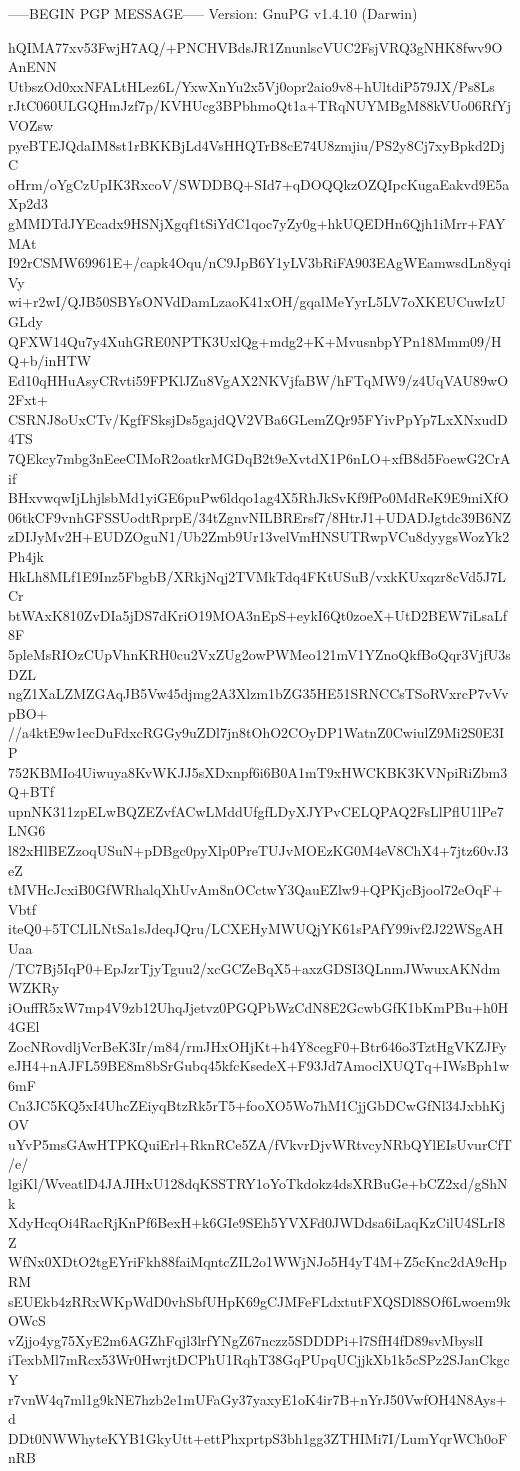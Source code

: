 -----BEGIN PGP MESSAGE-----
Version: GnuPG v1.4.10 (Darwin)

hQIMA77xv53FwjH7AQ/+PNCHVBdsJR1ZnunlscVUC2FsjVRQ3gNHK8fwv9OAnENN
UtbszOd0xxNFALtHLez6L/YxwXnYu2x5Vj0opr2aio9v8+hUltdiP579JX/Ps8Ls
rJtC060ULGQHmJzf7p/KVHUcg3BPbhmoQt1a+TRqNUYMBgM88kVUo06RfYjVOZsw
pyeBTEJQdaIM8st1rBKKBjLd4VsHHQTrB8cE74U8zmjiu/PS2y8Cj7xyBpkd2DjC
oHrm/oYgCzUpIK3RxcoV/SWDDBQ+SId7+qDOQQkzOZQIpcKugaEakvd9E5aXp2d3
gMMDTdJYEcadx9HSNjXgqf1tSiYdC1qoc7yZy0g+hkUQEDHn6Qjh1iMrr+FAYMAt
I92rCSMW69961E+/capk4Oqu/nC9JpB6Y1yLV3bRiFA903EAgWEamwsdLn8yqiVy
wi+r2wI/QJB50SBYsONVdDamLzaoK41xOH/gqalMeYyrL5LV7oXKEUCuwIzUGLdy
QFXW14Qu7y4XuhGRE0NPTK3UxlQg+mdg2+K+MvusnbpYPn18Mmm09/HQ+b/inHTW
Ed10qHHuAsyCRvti59FPKlJZu8VgAX2NKVjfaBW/hFTqMW9/z4UqVAU89wO2Fxt+
CSRNJ8oUxCTv/KgfFSksjDs5gajdQV2VBa6GLemZQr95FYivPpYp7LxXNxudD4TS
7QEkcy7mbg3nEeeCIMoR2oatkrMGDqB2t9eXvtdX1P6nLO+xfB8d5FoewG2CrAif
BHxvwqwIjLhjlsbMd1yiGE6puPw6ldqo1ag4X5RhJkSvKf9fPo0MdReK9E9miXfO
06tkCF9vnhGFSSUodtRprpE/34tZgnvNILBRErsf7/8HtrJ1+UDADJgtdc39B6NZ
zDIJyMv2H+EUDZOguN1/Ub2Zmb9Ur13velVmHNSUTRwpVCu8dyygsWozYk2Ph4jk
HkLh8MLf1E9Inz5FbgbB/XRkjNqj2TVMkTdq4FKtUSuB/vxkKUxqzr8cVd5J7LCr
btWAxK810ZvDIa5jDS7dKriO19MOA3nEpS+eykI6Qt0zoeX+UtD2BEW7iLsaLf8F
5pleMsRIOzCUpVhnKRH0cu2VxZUg2owPWMeo121mV1YZnoQkfBoQqr3VjfU3sDZL
ngZ1XaLZMZGAqJB5Vw45djmg2A3Xlzm1bZG35HE51SRNCCsTSoRVxrcP7vVvpBO+
//a4ktE9w1ecDuFdxcRGGy9uZDl7jn8tOhO2COyDP1WatnZ0CwiulZ9Mi2S0E3IP
752KBMIo4Uiwuya8KvWKJJ5sXDxnpf6i6B0A1mT9xHWCKBK3KVNpiRiZbm3Q+BTf
upnNK311zpELwBQZEZvfACwLMddUfgfLDyXJYPvCELQPAQ2FsLlPflU1lPe7LNG6
l82xHlBEZzoqUSuN+pDBgc0pyXlp0PreTUJvMOEzKG0M4eV8ChX4+7jtz60vJ3eZ
tMVHcJcxiB0GfWRhalqXhUvAm8nOCctwY3QauEZlw9+QPKjcBjool72eOqF+Vbtf
iteQ0+5TCLlLNtSa1sJdeqJQru/LCXEHyMWUQjYK61sPAfY99ivf2J22WSgAHUaa
/TC7Bj5IqP0+EpJzrTjyTguu2/xcGCZeBqX5+axzGDSI3QLnmJWwuxAKNdmWZKRy
iOuffR5xW7mp4V9zb12UhqJjetvz0PGQPbWzCdN8E2GcwbGfK1bKmPBu+h0H4GEl
ZocNRovdljVcrBeK3Ir/m84/rmJHxOHjKt+h4Y8cegF0+Btr646o3TztHgVKZJFy
eJH4+nAJFL59BE8m8bSrGubq45kfcKsedeX+F93Jd7AmoclXUQTq+IWsBph1w6mF
Cn3JC5KQ5xI4UhcZEiyqBtzRk5rT5+fooXO5Wo7hM1CjjGbDCwGfNl34JxbhKjOV
uYvP5msGAwHTPKQuiErl+RknRCe5ZA/fVkvrDjvWRtvcyNRbQYlEIsUvurCfT/e/
lgiKl/WveatlD4JAJIHxU128dqKSSTRY1oYoTkdokz4dsXRBuGe+bCZ2xd/gShNk
XdyHcqOi4RacRjKnPf6BexH+k6GIe9SEh5YVXFd0JWDdsa6iLaqKzCilU4SLrI8Z
WfNx0XDtO2tgEYriFkh88faiMqntcZIL2o1WWjNJo5H4yT4M+Z5cKnc2dA9cHpRM
sEUEkb4zRRxWKpWdD0vhSbfUHpK69gCJMFeFLdxtutFXQSDl8SOf6Lwoem9kOWcS
vZjjo4yg75XyE2m6AGZhFqjl3lrfYNgZ67nczz5SDDDPi+l7SfH4fD89svMbyslI
iTexbMl7mRcx53Wr0HwrjtDCPhU1RqhT38GqPUpqUCjjkXb1k5cSPz2SJanCkgcY
r7vnW4q7ml1g9kNE7hzb2e1mUFaGy37yaxyE1oK4ir7B+nYrJ50VwfOH4N8Ays+d
DDt0NWWhyteKYB1GkyUtt+ettPhxprtpS3bh1gg3ZTHIMi7I/LumYqrWCh0oFnRB
